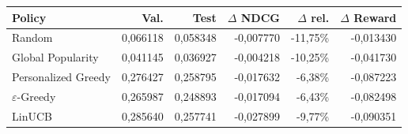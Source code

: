\begin{tabular}{lrrrrr}
\toprule
Policy & Val. & Test & $\Delta$ NDCG & $\Delta$ rel. & $\Delta$ Reward \\
\midrule
Random & 0,066118 & 0,058348 & -0,007770 & -11,75\% & -0,013430 \\
Global Popularity & 0,041145 & 0,036927 & -0,004218 & -10,25\% & -0,041730 \\
Personalized Greedy & 0,276427 & 0,258795 & -0,017632 & -6,38\% & -0,087223 \\
$\varepsilon$-Greedy & 0,265987 & 0,248893 & -0,017094 & -6,43\% & -0,082498 \\
LinUCB & 0,285640 & 0,257741 & -0,027899 & -9,77\% & -0,090351 \\
\bottomrule
\end{tabular}
